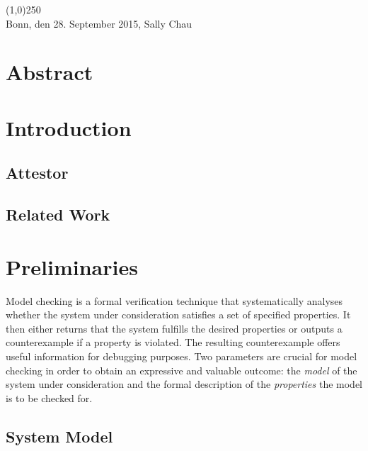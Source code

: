 \documentclass[a4paper, 12pt, twoside]{report}
\theoremstyle{plain}
\begin{document}
	\noindent\line(1,0){250}\\
	Bonn, den 28. September 2015, Sally Chau
	
	\clearpage\mbox{}\clearpage
	
	\chapter*{Abstract}
	
	\clearpage\mbox{}\clearpage
	
	\doublespacing
	\tableofcontents
	\singlespacing
	\clearpage\mbox{}\clearpage
	\thispagestyle{empty} 
	
	\pagestyle{fancy}
	\fancyhead[RE]{\nouppercase\leftmark}
	\fancyhead[LO]{\nouppercase\rightmark}
	\fancyhead[LE,RO]{\thepage}
	\cfoot{}
	
	
	\chapter{Introduction}
	
	\section{Attestor}
	
	\section{Related Work}
	
	\chapter{Preliminaries}
	
	
	Model checking is a formal verification technique that systematically analyses whether the system under consideration satisfies a set of specified properties. It then either returns that the system fulfills the desired properties or outputs a counterexample if a property is violated. The resulting counterexample offers useful information for debugging purposes. Two parameters are crucial for model checking in order to obtain an expressive and valuable outcome: the \textit{model} of the system under consideration and the formal description of the \textit{properties} the model is to be checked for.  
	
	\section{System Model}
	
\end{document}
